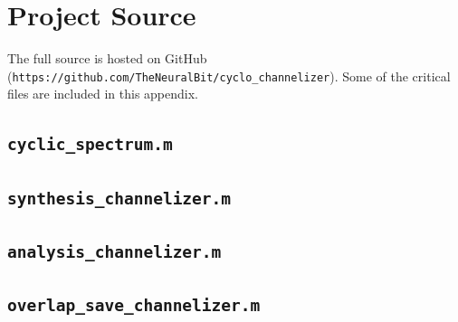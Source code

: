 \documentclass[12pt]{report}
\begin{document}
%
%

%



\nocite{*}


%

\appendix

\chapter{Project Source}
\label{sec:source}
The full source is hosted on GitHub
(\texttt{https://github.com/TheNeuralBit/cyclo\_channelizer}). Some of the
critical files are included in this appendix.

\section{\texttt{cyclic\_spectrum.m}}

\section{\texttt{synthesis\_channelizer.m}}

\section{\texttt{analysis\_channelizer.m}}

\section{\texttt{overlap\_save\_channelizer.m}}

\end{document}
